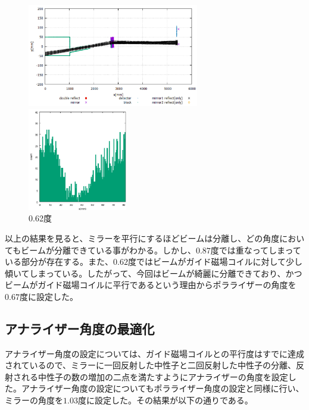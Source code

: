 \begin{figure}[H]
\begin{minipage}{0.50\hsize}
\begin{center}
\includegraphics[height=4.5cm]{angle/polthreesim.png}
\end{center}
\end{minipage}
\begin{minipage}{0.50\hsize}
\begin{center}
\includegraphics[height=4.5cm]{angle/polthreeex.png}
\end{center}
\end{minipage}
\caption{0.62度}
\end{figure}

以上の結果を見ると、ミラーを平行にするほどビームは分離し、どの角度においてもビームが分離できている事がわかる。しかし、$0.87$度では重なってしまっている部分が存在する。また、$0.62$度ではビームがガイド磁場コイルに対して少し傾いてしまっている。したがって、今回はビームが綺麗に分離できており、かつビームがガイド磁場コイルに平行であるという理由からポラライザーの角度を$0.67$度に設定した。

\subsection{アナライザー角度の最適化}

アナライザー角度の設定については、ガイド磁場コイルとの平行度はすでに達成されているので、ミラーに一回反射した中性子と二回反射した中性子の分離、反射される中性子の数の増加の二点を満たすようにアナライザーの角度を設定した。アナライザー角度の設定についてもポラライザー角度の設定と同様に行い、ミラーの角度を$1.03$度に設定した。その結果が以下の通りである。

